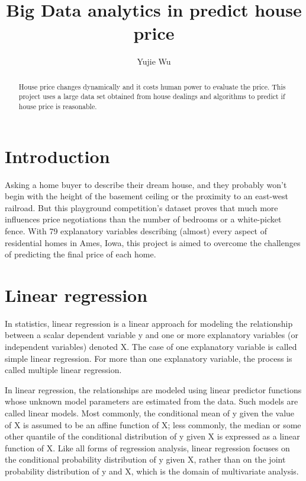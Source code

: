 \documentclass[sigconf]{acmart}
\begin{document}
\title{Big Data analytics in predict house price}


\author{Yujie Wu}



\renewcommand{\shortauthors}{B. Trovato et al.}


\begin{abstract}
\large  House price changes dynamically and it costs human power to evaluate the price. This project uses a large data set obtained from house dealings and algorithms to predict if house price is reasonable.
\end{abstract}


\maketitle

\section{Introduction}
\large Asking a home buyer to describe their dream house, and they probably won't begin with the height of the basement ceiling or the proximity to an east-west railroad. But this playground competition's dataset proves that much more influences price negotiations than the number of bedrooms or a white-picket fence. With 79 explanatory variables describing (almost) every aspect of residential homes in Ames, Iowa, this project is aimed to overcome the challenges of predicting the final price of each home.

\section{Linear regression}
\par In statistics, linear regression is a linear approach for modeling the relationship between a scalar dependent variable y and one or more explanatory variables (or independent variables) denoted X. The case of one explanatory variable is called simple linear regression. For more than one explanatory variable, the process is called multiple linear regression\cite{C1}.

In linear regression, the relationships are modeled using linear predictor functions whose unknown model parameters are estimated from the data. Such models are called linear models. Most commonly, the conditional mean of y given the value of X is assumed to be an affine function of X; less commonly, the median or some other quantile of the conditional distribution of y given X is expressed as a linear function of X. Like all forms of regression analysis, linear regression focuses on the conditional probability distribution of y given X, rather than on the joint probability distribution of y and X, which is the domain of multivariate analysis\cite{C1}.
\end{document}
